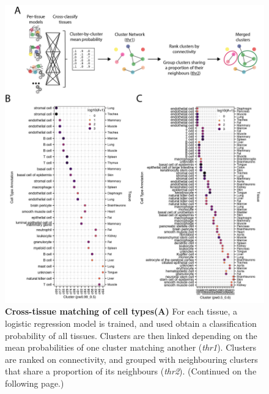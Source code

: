 \begin{figure}[pht!]
    \centering    
    \includegraphics[width=1.0\textwidth]{Chapter3/Figs/chap3_combineClusters.png} %
    \caption[Cross-tissue matching of cell types]{\textbf{Cross-tissue matching of cell types}\newline\textbf{(A)} For each tissue, a logistic regression model is trained, and used obtain a classification probability of all tissues. Clusters are then linked depending on the mean probabilities of one cluster matching another (\textit{thr1}). Clusters are ranked on connectivity, and grouped with neighbouring clusters that share a proportion of its neighbours (\textit{thr2}). (Continued on the following page.)}
    \label{fig:chap3_combcl}
\end{figure}
\begin{figure}[t]
\end{figure}

